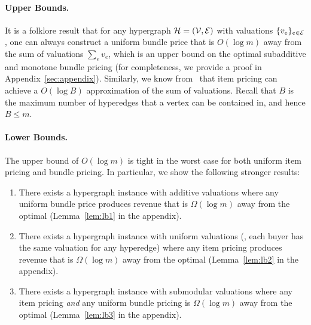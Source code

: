 \paragraph{Upper Bounds.}
It is a folklore result that for any hypergraph $\mathcal{H} = (\mathcal{V}, \mathcal{E})$ with valuations $\{v_e\}_{e \in \mathcal{E}}$, one can always construct a uniform bundle price that is $O(\log m)$ away from
the sum of valuations $\sum_e v_e$, which is an upper bound on the optimal subadditive and monotone bundle pricing (for completeness, we provide a proof in Appendix~\ref{sec:appendix}). Similarly, we know from~\cite{cheung2008approximation} that item pricing can achieve a $O(\log B)$ approximation of the sum of valuations. Recall that 
$B$ is the maximum number of hyperedges that a vertex can be contained in, and hence $B \leq m$. 

\paragraph{Lower Bounds.}
The upper bound of $O(\log m)$ is tight in the worst case for both uniform item pricing and bundle pricing. In particular, we show the following stronger results:
%
\begin{enumerate}
\item There exists a hypergraph instance with additive valuations where any uniform bundle price produces revenue that is $\Omega(\log m)$ away from the optimal (Lemma~\ref{lem:lb1} in the appendix).
\item There exists a hypergraph instance with uniform valuations (\ie, each buyer has the same valuation for any hyperedge) where any item pricing produces revenue that is $\Omega(\log m)$ away from the optimal (Lemma~\ref{lem:lb2} in the appendix).
\item There exists a hypergraph instance with submodular valuations where any item pricing {\em and} any uniform bundle pricing is  $\Omega(\log m)$ away from the optimal (Lemma~\ref{lem:lb3} in the appendix).
\end{enumerate} 
 




